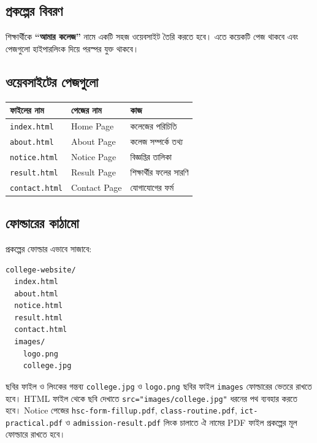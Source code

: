 \subsection{প্রকল্পের বিবরণ}

শিক্ষার্থীকে \textbf{``আমার কলেজ''} নামে একটি সহজ ওয়েবসাইট তৈরি করতে হবে। এতে কয়েকটি পেজ থাকবে এবং পেজগুলো হাইপারলিংক দিয়ে পরস্পর যুক্ত থাকবে।

\subsection{ওয়েবসাইটের পেজগুলো}

\begin{center}
\begin{tabular}{|p{}|p{}|p{}|}
\hline
\textbf{ফাইলের নাম} & \textbf{পেজের নাম} & \textbf{কাজ} \\
\hline
\texttt{index.html} & Home Page & কলেজের পরিচিতি \\
\hline
\texttt{about.html} & About Page & কলেজ সম্পর্কে তথ্য \\
\hline
\texttt{notice.html} & Notice Page & বিজ্ঞপ্তির তালিকা \\
\hline
\texttt{result.html} & Result Page & শিক্ষার্থীর ফলের সারণি \\
\hline
\texttt{contact.html} & Contact Page & যোগাযোগের ফর্ম \\
\hline
\end{tabular}
\end{center}

\subsection{ফোল্ডারের কাঠামো}

প্রকল্পের ফোল্ডার এভাবে সাজাবে:

\begin{verbatim}
college-website/
  index.html
  about.html
  notice.html
  result.html
  contact.html
  images/
    logo.png
    college.jpg
\end{verbatim}

\begin{keypointbox}{ছবির ফাইল ও লিংকের গন্তব্য}
\texttt{college.jpg} ও \texttt{logo.png} ছবির ফাইল \texttt{images} ফোল্ডারের ভেতরে রাখতে হবে। HTML ফাইল থেকে ছবি দেখাতে \texttt{src="images/college.jpg"} ধরনের পথ ব্যবহার করতে হবে। Notice পেজের \texttt{hsc-form-fillup.pdf}, \texttt{class-routine.pdf}, \texttt{ict-practical.pdf} ও \texttt{admission-result.pdf} লিংক চালাতে ঐ নামের PDF ফাইল প্রকল্পের মূল ফোল্ডারে রাখতে হবে।
\end{keypointbox}

